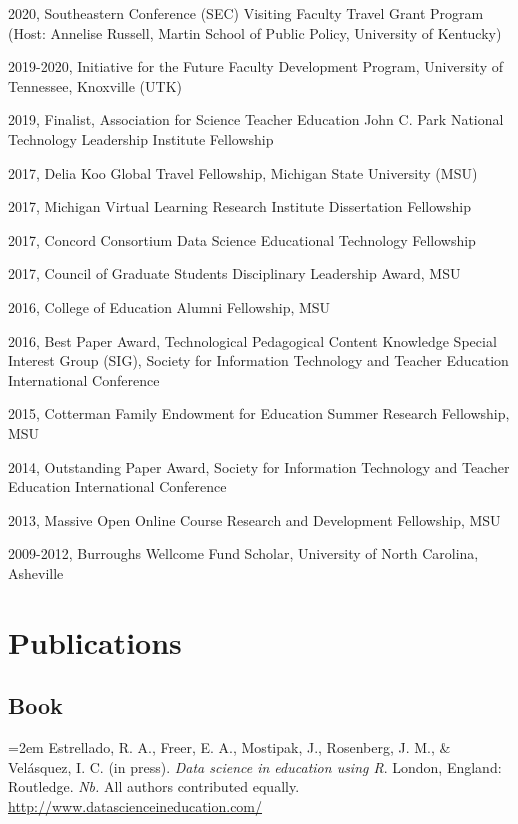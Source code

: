 \documentclass[
  14,
]{article}
\begin{document}
2020, Southeastern Conference (SEC) Visiting Faculty Travel Grant
Program (Host: Annelise Russell, Martin School of Public Policy,
University of Kentucky)

2019-2020, Initiative for the Future Faculty Development Program,
University of Tennessee, Knoxville (UTK)

2019, Finalist, Association for Science Teacher Education John C. Park
National Technology Leadership Institute Fellowship

2017, Delia Koo Global Travel Fellowship, Michigan State University
(MSU)

2017, Michigan Virtual Learning Research Institute Dissertation
Fellowship

2017, Concord Consortium Data Science Educational Technology Fellowship

2017, Council of Graduate Students Disciplinary Leadership Award, MSU

2016, College of Education Alumni Fellowship, MSU

2016, Best Paper Award, Technological Pedagogical Content Knowledge
Special Interest Group (SIG), Society for Information Technology and
Teacher Education International Conference

2015, Cotterman Family Endowment for Education Summer Research
Fellowship, MSU

2014, Outstanding Paper Award, Society for Information Technology and
Teacher Education International Conference

2013, Massive Open Online Course Research and Development Fellowship,
MSU

2009-2012, Burroughs Wellcome Fund Scholar, University of North
Carolina, Asheville

\hypertarget{publications}{%
\section{Publications}\label{publications}}

\hypertarget{book}{%
\subsection{Book}\label{book}}

\hangindent=2em Estrellado, R. A., Freer, E. A., Mostipak, J.,
Rosenberg, J. M., \& Velásquez, I. C. (in press). \emph{Data science in
education using R}. London, England: Routledge. \emph{Nb.} All authors
contributed equally. \url{http://www.datascienceineducation.com/}
\end{document}
